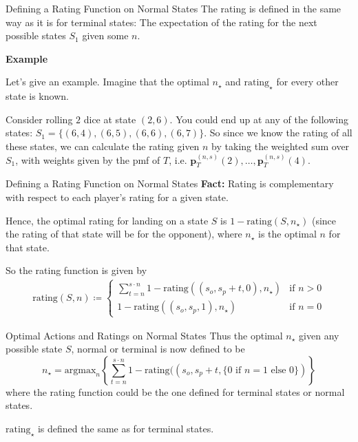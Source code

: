 \documentclass{beamer}
\begin{document}
\begin{frame}{Defining a Rating Function on Normal States}
    The rating is defined in the same way as it is for terminal states: The expectation of the rating for the next possible states $S_1$ given some $n$. 

    \textbf{Example}

    Let's give an example. Imagine that the optimal $n_{\star}$ and $\text{rating}_{\star}$ for every other state is known. 

    Consider rolling $2$ dice at state $(2, 6)$. You could end up at any of the following states: $S_1 = \{(6, 4), (6,5), (6,6), (6,7)\}$. So since we know the rating of all these states, we can calculate the rating given $n$ by taking the weighted sum over $S_1$, with weights given by the pmf of $T$, i.e. $\textbf{p}_{T}^{(n, s)}(2), \ldots, \textbf{p}_{T}^{(n, s)}(4)$.
\end{frame}

\begin{frame}{Defining a Rating Function on Normal States}
    \textbf{Fact:} Rating is complementary with respect to each player's rating for a given state.

    Hence, the optimal rating for landing on a state $S$ is $1-\text{rating}(S, n_{\star})$ (since the rating of that state will be for the opponent), where $n_{\star}$ is the optimal $n$ for that state. 


    So the rating function is given by
    \begin{align*}
        \text{rating}(S, n) \coloneqq \begin{cases}
            \sum_{t = n}^{s \cdot n} 1 - \text{rating}((s_o, s_p + t, 0), n_{\star}) & \text{if } n > 0 \\
            1- \text{rating}((s_o, s_p, 1), n_{\star}) & \text{if } n = 0
        \end{cases}
    \end{align*}
\end{frame}

\begin{frame}{Optimal Actions and Ratings on Normal States}
    Thus the optimal $n_{\star}$ given any possible state $S$, normal or terminal is now defined to be
    $$
    n_{\star} = \text{argmax}_{n} \left\{\sum_{t = n}^{s \cdot n} 1 - \text{rating}((s_o, s_p + t, \{0 \text{ if } n = 1 \text{ else } 0\}) \right\}
    $$
    where the rating function could be the one defined for terminal states or normal states.

    $\text{rating}_{\star}$ is defined the same as for terminal states.
\end{frame}
\end{document}
